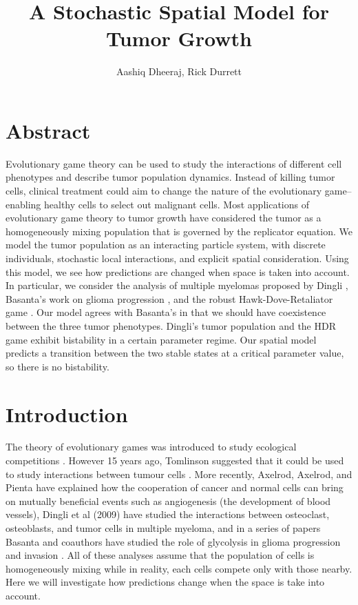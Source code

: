 \documentclass[12pt]{amsart}
\title{A Stochastic Spatial Model for Tumor Growth}
\author{Aashiq Dheeraj, Rick Durrett}
\begin{document}
\maketitle


\section{Abstract}
Evolutionary game theory can be used to study the interactions of different cell phenotypes and describe tumor population dynamics. Instead of killing tumor cells, clinical treatment could aim to change the nature of the evolutionary game-- enabling healthy cells to select out malignant cells. Most applications of  evolutionary game theory to tumor growth have considered the tumor as a homogeneously mixing population that is governed by the replicator equation. We model the tumor population as an interacting particle system, with discrete individuals, stochastic local interactions, and explicit spatial consideration. Using this model, we see how predictions are changed when space is taken into account. In particular, we consider the analysis of multiple myelomas proposed by Dingli \cite{Dingli2009}, Basanta's work on glioma progression \cite{Basanta2008}, and the robust Hawk-Dove-Retaliator game \cite{Smith1986} . Our model agrees with Basanta's in that we should have coexistence between the three tumor phenotypes. Dingli's tumor population and the HDR game exhibit bistability in a certain parameter regime. Our spatial model predicts a transition between the two stable states at a critical parameter value, so there is no bistability. 

\section{Introduction}
	The theory of evolutionary games was introduced to study ecological competitions \cite{Smith1986}. However 15 years ago, Tomlinson suggested that it could be used to study interactions between tumour cells \cite{Tomlinson1997,TomBod}. More recently, Axelrod, Axelrod, and Pienta  \cite{Axelrod2006} have explained how the cooperation of cancer and normal cells can bring on mutually beneficial events such as angiogenesis (the development of blood vessels), Dingli et al (2009) have studied the interactions between osteoclast, osteoblasts, and tumor cells in multiple myeloma, and in a series of papers Basanta and coauthors have studied the role of glycolysis in glioma progression and invasion \cite{Basanta2008,Basanta2011}. All of these analyses assume that the population of cells is homogeneously mixing while in reality, each cells compete only with those nearby. Here we will investigate how predictions change when the space is take into account.
	
\end{document}
